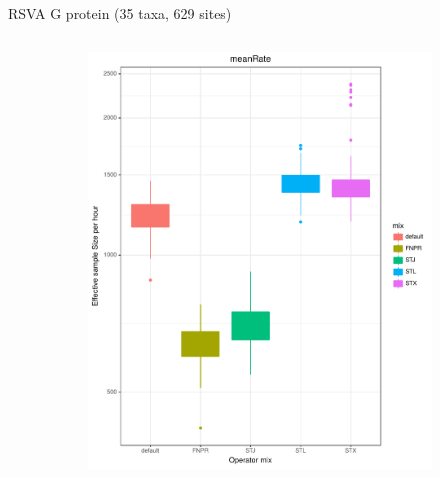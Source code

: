 \documentclass[newPxFont,numfooter,sectionpages]{beamer}
\begin{document}
\begin{frame}{RSVA G protein (35 taxa, 629 sites)}
\begin{figure}
\begin{column}{0.5\textwidth}
\begin{figure}
     \includegraphics[width=\textwidth]{figures/ESS_hour_meanRate_RSVA.pdf} \\
     \end{figure}
\end{column}
\end{figure}
\end{frame}
\end{document}
